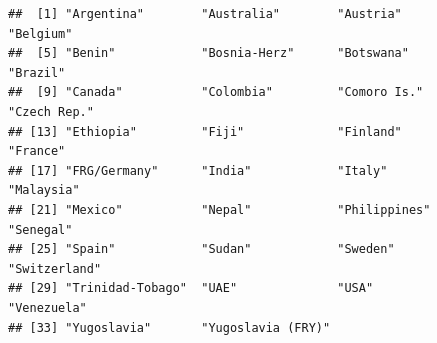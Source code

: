 \documentclass[
]{article}
\newenvironment{Shaded}{\begin{snugshade}}{\end{snugshade}}
\newcommand{\DecValTok}[1]{\textcolor[rgb]{0.00,0.00,0.81}{#1}}
\newcommand{\KeywordTok}[1]{\textcolor[rgb]{0.13,0.29,0.53}{\textbf{#1}}}
\newcommand{\NormalTok}[1]{#1}
\newcommand{\OperatorTok}[1]{\textcolor[rgb]{0.81,0.36,0.00}{\textbf{#1}}}
\newcommand{\StringTok}[1]{\textcolor[rgb]{0.31,0.60,0.02}{#1}}
\begin{document}
\begin{Shaded}
\end{Shaded}

\begin{verbatim}
##  [1] "Argentina"        "Australia"        "Austria"          "Belgium"         
##  [5] "Benin"            "Bosnia-Herz"      "Botswana"         "Brazil"          
##  [9] "Canada"           "Colombia"         "Comoro Is."       "Czech Rep."      
## [13] "Ethiopia"         "Fiji"             "Finland"          "France"          
## [17] "FRG/Germany"      "India"            "Italy"            "Malaysia"        
## [21] "Mexico"           "Nepal"            "Philippines"      "Senegal"         
## [25] "Spain"            "Sudan"            "Sweden"           "Switzerland"     
## [29] "Trinidad-Tobago"  "UAE"              "USA"              "Venezuela"       
## [33] "Yugoslavia"       "Yugoslavia (FRY)"
\end{verbatim}
\end{document}
